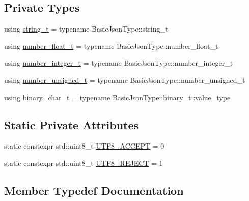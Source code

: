 \subsection*{Private Types}
\begin{DoxyCompactItemize}
\item 
using \hyperlink{classnlohmann_1_1detail_1_1serializer_ad08aa54fac1dd0a453320c54137d45ba}{string\+\_\+t} = typename Basic\+Json\+Type\+::string\+\_\+t
\item 
using \hyperlink{classnlohmann_1_1detail_1_1serializer_a460c6794fbabbb2ae83380e987a6c030}{number\+\_\+float\+\_\+t} = typename Basic\+Json\+Type\+::number\+\_\+float\+\_\+t
\item 
using \hyperlink{classnlohmann_1_1detail_1_1serializer_ae7b1df1c70bdec1371f297567726a198}{number\+\_\+integer\+\_\+t} = typename Basic\+Json\+Type\+::number\+\_\+integer\+\_\+t
\item 
using \hyperlink{classnlohmann_1_1detail_1_1serializer_a16c7b7a726a38ff0c06dce7ba7968391}{number\+\_\+unsigned\+\_\+t} = typename Basic\+Json\+Type\+::number\+\_\+unsigned\+\_\+t
\item 
using \hyperlink{classnlohmann_1_1detail_1_1serializer_aaaec32f2fec57db422019a11994f7bb5}{binary\+\_\+char\+\_\+t} = typename Basic\+Json\+Type\+::binary\+\_\+t\+::value\+\_\+type
\end{DoxyCompactItemize}
\subsection*{Static Private Attributes}
\begin{DoxyCompactItemize}
\item 
static constexpr std\+::uint8\+\_\+t \hyperlink{classnlohmann_1_1detail_1_1serializer_a2311a8c756c4a119aa82cd55301d13bc}{U\+T\+F8\+\_\+\+A\+C\+C\+E\+PT} = 0
\item 
static constexpr std\+::uint8\+\_\+t \hyperlink{classnlohmann_1_1detail_1_1serializer_a833bd5805e4380549f4e21c304820d6d}{U\+T\+F8\+\_\+\+R\+E\+J\+E\+CT} = 1
\end{DoxyCompactItemize}


\subsection{Member Typedef Documentation}
